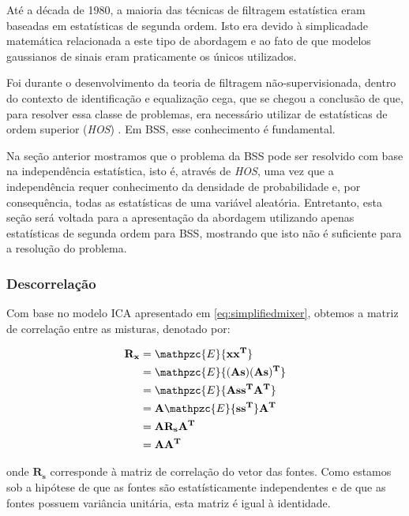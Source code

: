     Até a década de 1980, a maioria das técnicas de filtragem estatística eram baseadas em estatísticas de segunda ordem. Isto era devido à simplicadade matemática relacionada a este tipo de abordagem e ao fato de que modelos gaussianos de sinais eram praticamente os únicos utilizados. 
    
    Foi durante o desenvolvimento da teoria de filtragem não-supervisionada, dentro do contexto de identificação e equalização cega, que se chegou a conclusão de que, para resolver essa classe de problemas, era necessário utilizar de estatísticas de ordem superior (\textit{HOS}) \cite{HOS}. Em BSS, esse conhecimento é fundamental.
    
    Na seção anterior mostramos que o problema da BSS pode ser resolvido com base na independência estatística, isto é, através de \textit{HOS}, uma vez que a independência requer conhecimento da densidade de probabilidade e, por consequência, todas as estatísticas de uma variável aleatória. Entretanto, esta seção será voltada para a apresentação da abordagem utilizando apenas estatísticas de segunda ordem para BSS, mostrando que isto não é suficiente para a resolução do problema.
    
    \subsubsection{Descorrelação}
    Com base no modelo ICA apresentado em \ref{eq:simplifiedmixer}, obtemos a matriz de correlação entre as misturas, denotado por:
    
    \begin{equation}
        \label{eq:correlationmatrixforx}
        \begin{split}
        \mathbf{R_x} & = \mathpzc{E}\{\mathbf{xx^T}\}\\
                     & = \mathpzc{E}\{\mathbf{(As)(As)^T}\}\\
                     & = \mathpzc{E}\{\mathbf{Ass^TA^T}\} \\
                     & = \mathbf{A}\mathpzc{E}\{\mathbf{ss^T}\}\mathbf{A^T} \\
                     & = \mathbf{A}\mathbf{R_s}\mathbf{A^T} \\
                     & = \mathbf{A}\mathbf{A^T} \\
        \end{split}
    \end{equation}
    
    onde $\mathbf{R_s}$ corresponde à matriz de correlação do vetor das fontes. Como estamos sob a hipótese de que as fontes são estatísticamente independentes e de que as fontes possuem variância unitária, esta matriz é igual à identidade.
    
